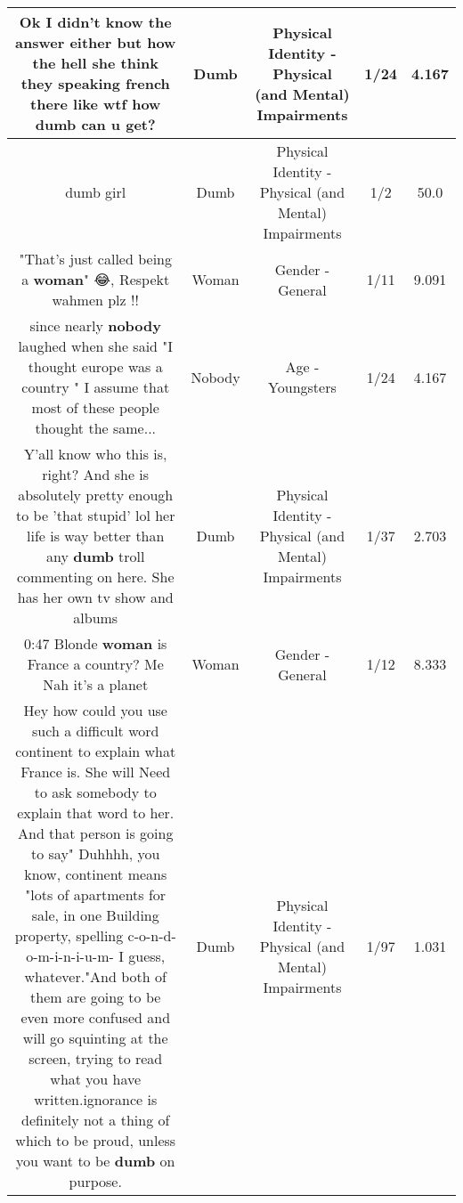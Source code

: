 \documentclass[11pt]{article}
\newlength\mylength
\begin{document}
\begin{center}
\begin{longtable}{|C{.65\mylength}|C{.30\mylength}|C{.12\mylength}|C{.12\mylength}|C{.12\mylength}|}
  \small Ok I didn't know the answer either but how the hell she think they speaking french there like wtf how \textbf{dumb} can u get?\normalsize   & Dumb & Physical Identity - Physical (and Mental) Impairments & 1/24 & 4.167 \\  \hline
  \small dumb girl\normalsize   & Dumb & Physical Identity - Physical (and Mental) Impairments & 1/2 & 50.0 \\  \hline
  \small "That's just called being a \textbf{woman}" 😂, Respekt wahmen plz !!\normalsize   & Woman & Gender - General & 1/11 & 9.091 \\  \hline
  \small since nearly \textbf{nobody} laughed when she said "I thought europe was a country " I assume that most of these people thought the same...\normalsize   & Nobody & Age - Youngsters & 1/24 & 4.167 \\  \hline
  \small Y'all know who this is, right? And she is absolutely pretty enough to be 'that stupid' lol her life is way better than any \textbf{dumb} troll commenting on here. She has her own tv show and albums\normalsize   & Dumb & Physical Identity - Physical (and Mental) Impairments & 1/37 & 2.703 \\  \hline
  \small 0:47 Blonde \textbf{woman} is France a country?       Me Nah it's a planet\normalsize   & Woman & Gender - General & 1/12 & 8.333 \\  \hline
  \small Hey how could you use such a difficult  word continent to explain what France is. She will Need to ask somebody to explain that word to her. And that person is going to say" Duhhhh, you know, continent means "lots of apartments for sale, in one Building property, spelling c-o-n-d-o-m-i-n-i-u-m- I guess, whatever."And both of them are going to be even more confused and will go squinting at the screen, trying to read what you have written.ignorance is definitely not a thing of which to be proud, unless you want to be \textbf{dumb} on purpose.\normalsize   & Dumb & Physical Identity - Physical (and Mental) Impairments & 1/97 & 1.031 \\  \hline

\end{longtable}
\end{center}
\end{document}
